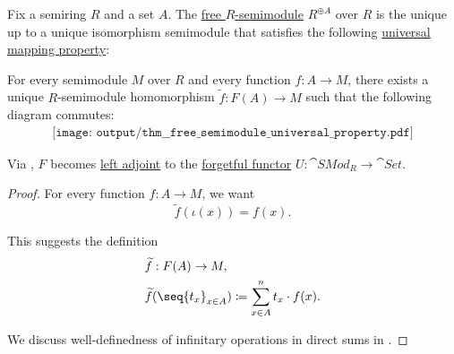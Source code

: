 \begin{proposition}\label{thm:free_semimodule_universal_property}
  Fix a semiring \( R \) and a set \( A \). The \hyperref[def:free_semimodule]{free \( R \)-semimodule} \( R^{\oplus A} \) over \( R \) is the unique up to a unique isomorphism semimodule that satisfies the following \hyperref[rem:universal_mapping_property]{universal mapping property}:
  \begin{displayquote}
    For every semimodule \( M \) over \( R \) and every function \( f: A \to M \), there exists a unique \( R \)-semimodule homomorphism \( \widetilde{f}: F(A) \to M \) such that the following diagram commutes:
    \begin{equation}\label{eq:thm:free_semimodule_universal_property/diagram}
      \begin{aligned}
        \texttt{[image: output/thm\_\_free\_semimodule\_universal\_property.pdf]}
      \end{aligned}
    \end{equation}
  \end{displayquote}

  Via , \( F \) becomes \hyperref[def:category_adjunction]{left adjoint} to the \hyperref[def:concrete_category]{forgetful functor} \( U: \cat{SMod}_R \to \cat{Set} \).
\end{proposition}
\begin{proof}
  For every function \( f: A \to M \), we want
  \begin{equation*}
    \widetilde{f}(\iota(x)) = f(x).
  \end{equation*}

  This suggests the definition
  \begin{equation*}
    \begin{aligned}
      &\widetilde{f}: F(A) \to M, \\
      &\widetilde{f}(\seq{ t_x }_{x \in A}) \coloneqq \sum_{x \in A}^n t_x \cdot f(x).
    \end{aligned}
  \end{equation*}

  We discuss well-definedness of infinitary operations in direct sums in .
\end{proof}

